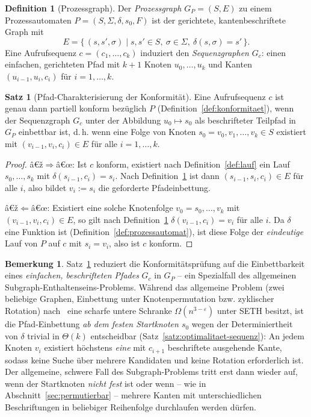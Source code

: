 ﻿\documentclass[a4paper,12pt]{article}
\theoremstyle{definition}
\newtheorem{definition}{Definition}
\newtheorem{satz}{Satz}
\newtheorem{bemerkung}{Bemerkung}
\begin{document}
\begin{definition}[Prozessgraph]
	\label{def:prozessgraph}
	Der \emph{Prozessgraph} $G_P=(S,E)$ zu einem Prozessautomaten
	$P=(S,\Sigma,\delta,s_0,F)$ ist der gerichtete, kantenbeschriftete Graph mit
	\[
		E = \{\, (s,s',\sigma) \mid s,s' \in S,\ \sigma\in\Sigma,\ \delta(s,\sigma)=s' \,\}.
	\]
	Eine Aufrufsequenz $c=(c_1,\ldots,c_k)$ induziert den \emph{Sequenzgraphen}
	$G_c$: einen einfachen, gerichteten Pfad mit $k+1$ Knoten $u_0,\ldots,u_k$ und Kanten
	$(u_{i-1},u_i,c_i)$ für $i=1,\ldots,k$.
\end{definition}

\begin{satz}[Pfad-Charakterisierung der Konformität]
	\label{satz:pfadcharakterisierung}
	Eine Aufrufsequenz $c$ ist genau dann partiell konform bezüglich $P$
	(Definition~\ref{def:konformitaet}), wenn der Sequenzgraph $G_c$ unter der Abbildung
	$u_0 \mapsto s_0$ als beschrifteter Teilpfad in $G_P$ einbettbar ist, d.\,h. wenn eine
	Folge von Knoten $s_0=v_0,v_1,\ldots,v_k \in S$ existiert mit
	$(v_{i-1},v_i,c_i)\in E$ für alle $i=1,\ldots,k$.
\end{satz}

\begin{proof}
	â€ž$\Rightarrow$â€œ: Ist $c$ konform, existiert nach Definition~\ref{def:lauf} ein Lauf
	$s_0,\ldots,s_k$ mit $\delta(s_{i-1},c_i)=s_i$. Nach Definition~\ref{def:prozessgraph}
	ist dann $(s_{i-1},s_i,c_i)\in E$ für alle $i$, also bildet $v_i:=s_i$ die geforderte
	Pfadeinbettung.

	â€ž$\Leftarrow$â€œ: Existiert eine solche Knotenfolge $v_0=s_0,\ldots,v_k$ mit
	$(v_{i-1},v_i,c_i)\in E$, so gilt nach Definition~\ref{def:prozessgraph}
	$\delta(v_{i-1},c_i)=v_i$ für alle $i$. Da $\delta$ eine Funktion ist
	(Definition~\ref{def:prozessautomat}), ist diese Folge der \emph{eindeutige} Lauf von
	$P$ auf $c$ mit $s_i=v_i$, also ist $c$ konform. \qedhere
\end{proof}

\begin{bemerkung}
	\label{bem:einfacher-fall}
	Satz~\ref{satz:pfadcharakterisierung} reduziert die Konformitätsprüfung auf die
	Einbettbarkeit eines \emph{einfachen, beschrifteten Pfades} $G_c$ in $G_P$ -- ein
	Spezialfall des allgemeinen Subgraph-Enthaltenseins-Problems. Während das allgemeine
	Problem (zwei beliebige Graphen, Einbettung unter Knotenpermutation bzw. zyklischer
	Rotation) nach~\cite{epp2026subgraph} eine scharfe untere Schranke
	$\Omega(n^{3-\varepsilon})$ unter SETH besitzt, ist die Pfad-Einbettung \emph{ab dem
	festen Startknoten $s_0$} wegen der Determiniertheit von $\delta$ trivial in
	$\Theta(k)$ entscheidbar (Satz~\ref{satz:optimalitaet-sequenz}): An jedem Knoten $v_i$
	existiert höchstens \emph{eine} mit $c_{i+1}$ beschriftete ausgehende Kante, sodass
	keine Suche über mehrere Kandidaten und keine Rotation erforderlich ist. Der
	allgemeine, schwere Fall des Subgraph-Problems tritt erst dann wieder auf, wenn der
	Startknoten \emph{nicht fest} ist oder wenn -- wie in
	Abschnitt~\ref{sec:permutierbar} -- mehrere Kanten mit unterschiedlichen Beschriftungen
	in beliebiger Reihenfolge durchlaufen werden dürfen.
\end{bemerkung}
\end{document}
